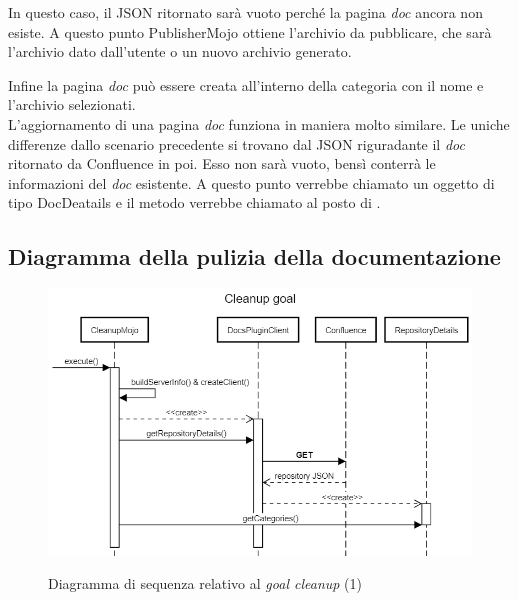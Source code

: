 In questo caso, il JSON ritornato sarà vuoto perché la pagina \emph{doc} ancora non esiste.
A questo punto PublisherMojo ottiene l'archivio da pubblicare, che sarà l'archivio dato dall'utente o un nuovo archivio generato.

Infine la pagina \emph{doc} può essere creata all'interno della categoria con il nome e l'archivio selezionati. \\

L'aggiornamento di una pagina \emph{doc} funziona in maniera molto similare.
Le uniche differenze dallo scenario precedente si trovano dal JSON riguradante il \emph{doc} ritornato da Confluence in poi.
Esso non sarà vuoto, bensì conterrà le informazioni del \emph{doc} esistente.
A questo punto verrebbe chiamato un oggetto di tipo DocDeatails e il metodo  verrebbe chiamato al posto di .


\subsection{Diagramma della pulizia della documentazione}


\begin{figure}[H]
    \centering
    \includegraphics[width=\textwidth]{immagini/CleanupSeq1.png}\\
    \caption{Diagramma di sequenza relativo al \emph{goal cleanup} (1)}
\end{figure}

